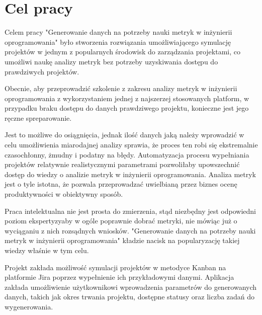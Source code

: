 \section*{Cel pracy}
Celem pracy "Generowanie danych na potrzeby nauki metryk w inżynierii oprogramowania" było stworzenia rozwiązania umożliwiającego symulację projektów w jednym z popularnych środowisk do zarządzania projektami,
co umożliwi naukę analizy metryk bez potrzeby uzyskiwania dostępu do prawdziwych projektów.

Obecnie, aby przeprowadzić szkolenie z zakresu analizy metryk w inżynierii oprogramowania z wykorzystaniem jednej z najszerzej stosowanych platform, w przypadku braku dostępu do danych prawdziwego projektu,
konieczne jest jego ręczne spreparowanie.

Jest to możliwe do osiągnięcia, jednak ilość danych jaką należy wprowadzić w celu umożliwienia miarodajnej analizy sprawia, że proces ten robi się ekstremalnie czasochłonny, żmudny i podatny na błędy.
Automatyzacja procesu wypełniania projektów relatywnie realistycznymi parametrami pozwoliłaby upowszechnić dostęp do wiedzy o analizie metryk w inżynierii oprogramowania.
Analiza metryk jest o tyle istotna, że pozwala przeprowadzać uwielbianą przez biznes ocenę produktywności w obiektywny sposób.

Praca intelektualna nie jest prosta do zmierzenia, stąd niezbędny jest odpowiedni poziom ekspertyzyaby w ogóle poprawnie dobrać metryki, nie mówiąc już o wyciąganiu z nich rozsądnych wniosków.
"Generowanie danych na potrzeby nauki metryk w inżynierii oprogramowania" kładzie nacisk na popularyzację takiej wiedzy właśnie w tym celu.

Projekt zakłada możliwość symulacji projektów w metodyce Kanban na platformie Jira poprzez wypełnienie ich przykładowymi danymi. Aplikacja zakłada umożliwienie użytkownikowi wprowadzenia parametrów do generowanych danych,
takich jak okres trwania projektu, dostępne statusy oraz liczba zadań do wygenerowania.

